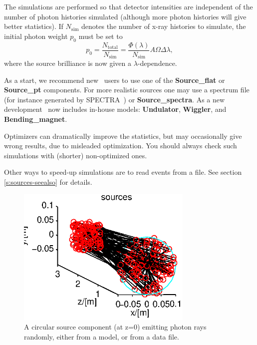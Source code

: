 The simulations are performed so that detector intensities
are independent of the number of photon histories simulated
(although more photon histories will give better statistics).
If $N_\mathrm{sim}$ denotes the number of
x-ray histories to simulate, the initial photon weight $p_0$ must be set to
\begin{equation}
\label{proprule}
p_0 = \frac{N_\mathrm{total}}{N_\mathrm{sim}} =
    \frac{\Phi(\lambda)}{N_\mathrm{sim}} A \Omega \Delta\lambda ,
\end{equation}
where the source brilliance is now given a $\lambda$-dependence.

As a start, we recommend new \MCX\ users to use one of  the
\textbf{Source\_flat} or \textbf{Source\_pt} components.
For more realistic sources one may use a spectrum file (for instance
generated by SPECTRA~\cite{spectra}) or \textbf{Source\_spectra}.
As a new development \MCX\ now includes in-house models: \textbf{Undulator}, \textbf{Wiggler}, and \textbf{Bending\_magnet}.

Optimizers can dramatically improve the statistics, but may occasionally
give wrong results, due to misleaded optimization.
You should always check such simulations with (shorter) non-optimized ones.

Other ways to speed-up simulations are to read events from a file.
See section \ref{s:sources-seealso} for details.

\begin{figure}
  \begin{center}
    \includegraphics[width=0.75\textwidth]{figures/sources.eps}
  \end{center}
\caption{A circular source component (at z=0) emitting photon rays randomly, either from a model, or from a data file.}
\label{f:source}
\end{figure}

